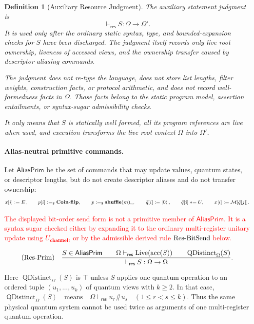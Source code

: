 \documentclass[acmsmall,screen,review,anonymous,nonacm]{acmart}
\newtheorem{definition}{Definition}[section]
\theoremstyle{defn_style}
\newcommand{\asteq}{\mathrel{*}=}
\begin{document}
\begin{definition}[Auxiliary Resource Judgment]
The auxiliary statement judgment is
\[
\vdash_{\mathsf{res}}S: \Omega\rightarrow\Omega'.
\]
It is used only after the ordinary static syntax, type, and bounded-expansion
checks for \(S\) have been discharged. The judgment itself records only live
root ownership, liveness of accessed views, and the ownership transfer caused
by descriptor-aliasing commands.

The judgment does not re-type the language, does not store list lengths, filter
weights, construction facts, or protocol arithmetic, and does not record
well-formedness facts in \(\Omega\). Those facts belong to the static program
model, assertion entailments, or syntax-sugar admissibility checks.

It only means that \(S\) is statically well formed, all its program references are
live when used, and execution transforms the live root context \(\Omega\) into
\(\Omega'\).

\end{definition}


\paragraph{Alias-neutral primitive commands.}

Let \(\mathsf{AliasPrim}\) be the set of commands that may update values,
quantum states, or descriptor lengths, but do not create descriptor aliases and
do not transfer ownership:
\[
x[i]:=E,\qquad
p[i]:=_\$ \mathbf{Coin\mbox{-}flip},\qquad
p:=_\$\mathbf{shuffle}(m)_n,
\qquad
\bar q[i]:=\ket0,
\qquad
\bar q[\mathbf i]\asteq U,
\qquad
x[i]:=\mathcal M[\bar q[j]].
\]

\textcolor{red}{The displayed bit-order send form is not a primitive member of \(\mathsf{AliasPrim}\).  It is a syntax sugar checked either by expanding it to the ordinary multi-register unitary update using \(U_{\textbf{channel}}\), or by the admissible derived rule \({\rm Res\mbox{-}BitSend}\) below.}

\[
\text{\rm (Res-Prim)}
\quad
\frac{
S\in\mathsf{AliasPrim}
\qquad
\Omega\vdash_{\mathsf{res}}\operatorname{Live}(\operatorname{acc}(S))
\qquad
\operatorname{QDistinct}_{\Omega}(S)
}{
\vdash_{\mathsf{res}}S:\Omega\rightarrow\Omega
}.
\]


Here \(\operatorname{QDistinct}_{\Omega}(S)\) is \(\top\) unless \(S\)
applies one quantum operation to an ordered tuple
\((u_1,\ldots,u_k)\) of quantum views with \(k\ge 2\). In that case,
\(\operatorname{QDistinct}_{\Omega}(S)
\quad\text{means}\quad
\Omega\vdash_{\mathsf{res}} u_r\#u_s
\quad(1\le r<s\le k).\)
Thus the same physical quantum system cannot be used twice as
arguments of one multi-register quantum operation.
\end{document}
